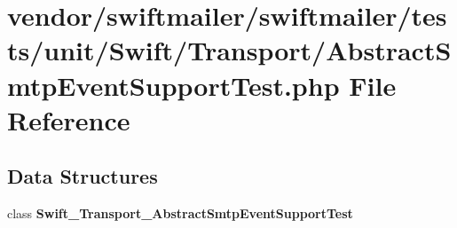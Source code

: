 \section{vendor/swiftmailer/swiftmailer/tests/unit/\+Swift/\+Transport/\+Abstract\+Smtp\+Event\+Support\+Test.php File Reference}
\label{_abstract_smtp_event_support_test_8php}
\subsection*{Data Structures}
\begin{DoxyCompactItemize}
\item 
class {\bf Swift\+\_\+\+Transport\+\_\+\+Abstract\+Smtp\+Event\+Support\+Test}
\end{DoxyCompactItemize}
